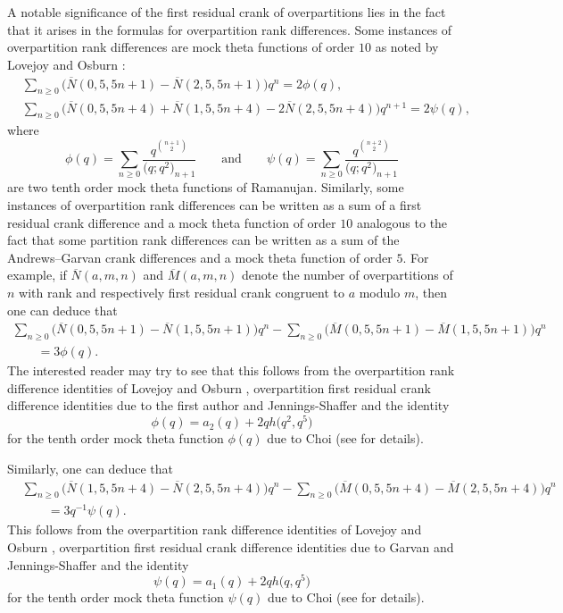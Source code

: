 \documentclass[10pt,a4paper]{amsart}
\numberwithin{equation}{section}
\begin{document}
A notable significance of the first residual crank of overpartitions lies in the fact that it arises in the formulas for overpartition rank differences. Some instances of overpartition rank differences are mock theta functions of order $10$ as noted by Lovejoy and Osburn \cite[p.~197]{Lo-Os10}:
\begin{align*}
&\sum_{n\geq 0}\bigl(\overline{N}(0,5,5n+1)-\overline{N}(2,5,5n+1)\bigr)q^n=2\phi(q),
\\
&\sum_{n\geq 0}\bigl(\overline{N}(0,5,5n+4)+\overline{N}(1,5,5n+4)-2\overline{N}(2,5,5n+4)\bigr)q^{n+1}=2\psi(q),
\end{align*}
where
\begin{equation*}
\phi(q)=\sum\limits_{n\geq 0}\frac{q^{\binom{n+1}{2}}}{\bigl(q;q^2\bigr)_{n+1}}
\qquad\mbox{and}\qquad
\psi(q)=\sum\limits_{n\geq 0}\frac{q^{\binom{n+2}{2}}}{\bigl(q;q^2\bigr)_{n+1}}
\end{equation*}
are two tenth order mock theta functions of Ramanujan.
Similarly, some instances of overpartition rank differences can be written as a sum of a first residual crank difference and a mock theta function of order $10$ analogous to the fact that some partition rank differences can be written as a sum of the Andrews--Garvan crank differences and a mock theta function of order $5$. For example, if $\overline{N}(a,m,n)$ and $\overline{M}(a,m,n)$ denote the number of overpartitions of $n$ with rank and respectively first residual crank congruent to $a$ modulo $m$, then one can deduce that
\begin{gather*}
\sum_{n\geq 0}\bigl(\overline{N}(0,5,5n+1)-\overline{N}(1,5,5n+1)\bigr)q^n-\sum_{n\geq 0}\bigl(\overline{M}(0,5,5n+1)-\overline{M}(1,5,5n+1)\bigr)q^n \\
\qquad{}=3\phi(q).
\end{gather*}
The interested reader may try to see that this follows from the overpartition rank difference identities of Lovejoy and Osburn {\cite[equations~(1.6) and~(1.11)]{Lo-Os08}}, overpartition first residual crank difference identities due to the first author and Jennings-Shaffer \cite[Theorem~2.10]{Ga-Sh} and the identity
\begin{equation*}%
\phi(q)=a_2(q)+2qh\bigl(q^2,q^5\bigr)
\end{equation*}
for the tenth order mock theta function $\phi(q)$ due to Choi (see \cite[p. 534]{Ch99} for details).

Similarly, one can deduce that
\begin{align*}
&{}\sum_{n\geq 0}\bigl(\overline{N}(1,5,5n+4)-\overline{N}(2,5,5n+4)\bigr)q^n-\sum_{n\geq 0}\bigl(\overline{M}(0,5,5n+4)-\overline{M}(2,5,5n+4)\bigr)q^n \\
&{}\qquad{}=3q^{-1}\psi(q).
\end{align*}
This follows from the overpartition rank difference identities of Lovejoy and Osburn \cite[equations~(1.6) and~(1.11)]{Lo-Os08}, overpartition first residual crank difference identities due to Garvan and Jennings-Shaffer \cite[Theorem~2.10]{Ga-Sh} and the identity
\begin{equation*}
\psi(q)=a_1(q)+2qh\bigl(q,q^5\bigr)
\end{equation*}
for the tenth order mock theta function $\psi(q)$ due to Choi (see \cite[p.~533]{Ch99} for details).
\end{document}
